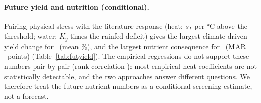 \paragraph{Future yield and nutrition (conditional).} Pairing physical stress with the literature response
(heat: $s_T$ per \si{\celsius} above the threshold; water: $K_y$ times the rainfed deficit) gives the largest
climate-driven yield change for \futYieldWorst\ (mean \futYieldWorstValue\%), and the largest nutrient
consequence for \futNutTopPair\ (MAR \futNutTopMar\ points) (Table~\ref{tab:futyield}). The empirical
regressions do not support these numbers pair by pair (rank correlation \corrLitEmp): most empirical
heat coefficients are not statistically detectable, and the two approaches answer different questions.
We therefore treat the future nutrient numbers as a conditional screening estimate, not a forecast.
